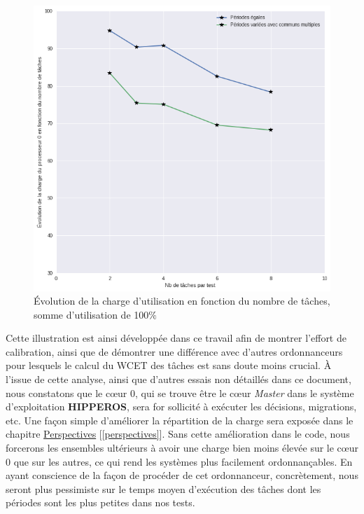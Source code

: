 \begin{figure}[H]
	\label{evowcethomogene}
	\caption{Évolution de la charge d'utilisation en fonction du nombre de tâches, somme d'utilisation de 100$\%$}
	\includegraphics[scale=0.6]{img/wcet/load_100u}
\end{figure}

Cette illustration est ainsi développée dans ce travail afin de montrer l'effort de calibration, ainsi que 
de démontrer une différence avec d'autres ordonnanceurs pour lesquels le calcul du WCET des tâches est 
sans doute moins crucial. À l'issue de cette analyse, ainsi que d'autres essais non détaillés dans ce 
document, nous constatons que le cœur $0$, qui se trouve être le cœur \textit{Master} dans le système d'exploitation \textbf{HIPPEROS}, 
sera for sollicité à exécuter les décisions, migrations, etc. Une façon simple d'améliorer la répartition de la 
charge sera exposée dans le chapitre \hyperref[perspectives]{Perspectives} [\ref{perspectives}]. 
Sans cette amélioration dans le code, nous forcerons les ensembles ultérieurs 
à avoir une charge bien moins élevée sur le cœur $0$ que sur les autres, ce qui rend les systèmes 
plus facilement ordonnançables. En ayant conscience de la façon de procéder de cet ordonnanceur, 
concrètement, nous seront plus pessimiste sur le temps moyen d'exécution des tâches 
dont les périodes sont les plus petites dans nos tests. 


